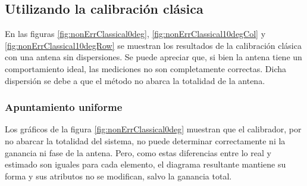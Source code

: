 \subsection{Utilizando la calibración clásica}

En las figuras \ref{fig:nonErrClassical0deg}, \ref{fig:nonErrClassical10degCol} y \ref{fig:nonErrClassical10degRow} se muestran
los resultados de la calibración clásica con una antena sin dispersiones. Se puede apreciar que, si bien la antena tiene un 
comportamiento ideal, las mediciones no son completamente correctas. Dicha dispersión se debe a que el método no abarca la 
totalidad de la antena.


\subsubsection{Apuntamiento uniforme}

Los gráficos de la figura \ref{fig:nonErrClassical0deg} muestran que el calibrador, por no abarcar la totalidad del sistema, no 
puede determinar correctamente ni la ganancia ni fase de la antena. Pero, como estas diferencias entre lo real y estimado son 
iguales para cada elemento, el diagrama resultante mantiene su forma y sus atributos no se modifican, salvo la ganancia total.

